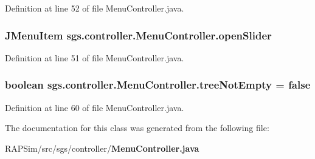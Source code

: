 Definition at line 52 of file Menu\-Controller.\-java.

\subsubsection[{open\-Slider}]{\setlength{\rightskip}{0pt plus 5cm}J\-Menu\-Item sgs.\-controller.\-Menu\-Controller.\-open\-Slider\hspace{0.3cm}{\ttfamily [static]}}\label{classsgs_1_1controller_1_1_menu_controller_adbcfdb169919286ca01605925cc5fba6}


Definition at line 51 of file Menu\-Controller.\-java.

\subsubsection[{tree\-Not\-Empty}]{\setlength{\rightskip}{0pt plus 5cm}boolean sgs.\-controller.\-Menu\-Controller.\-tree\-Not\-Empty = false\hspace{0.3cm}{\ttfamily [static]}}\label{classsgs_1_1controller_1_1_menu_controller_a8c8cd310d5fbd02203ca812697632fb4}


Definition at line 60 of file Menu\-Controller.\-java.



The documentation for this class was generated from the following file\-:\begin{DoxyCompactItemize}
\item 
R\-A\-P\-Sim/src/sgs/controller/{\bf Menu\-Controller.\-java}\end{DoxyCompactItemize}
